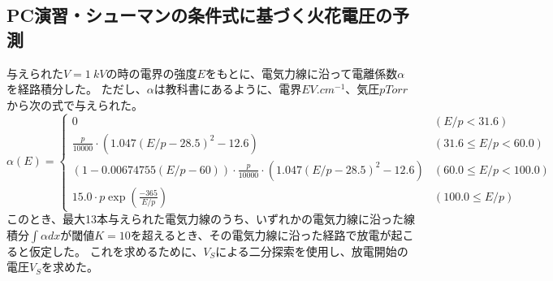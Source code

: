 \documentclass[a4paper]{ltjsarticle}
\begin{document}
\subsection{PC演習・シューマンの条件式に基づく火花電圧の予測}
与えられた$V=\SI{1}{kV}$の時の電界の強度$E$をもとに、電気力線に沿って電離係数$\alpha$を経路積分した。
ただし、$\alpha$は教科書にあるように、電界$E\si{V.cm^{-1}}$、気圧$p\si{Torr}$から次の式で与えられた。
\begin{equation}
    \alpha(E) = \begin{cases}
        0 & (E/p < 31.6) \\
        \frac{p}{10000}\cdot(1.047(E/p-28.5)^2 - 12.6) & (31.6 \leq E/p < 60.0) \\
        (1 - 0.00674755(E/p-60))\cdot\frac{p}{10000}\cdot(1.047(E/p-28.5)^2 - 12.6) & (60.0 \leq E/p < 100.0) \\
        15.0\cdot p\exp\left(\frac{-365}{E/p}\right) & (100.0 \leq E/p)
    \end{cases} \label{eq:alpha_sim}
\end{equation}
このとき、最大13本与えられた電気力線のうち、いずれかの電気力線に沿った線積分$\int\alpha dx$が閾値$K=10$を超えるとき、その電気力線に沿った経路で放電が起こると仮定した。
これを求めるために、$V_S$による二分探索を使用し、放電開始の電圧$V_S$を求めた。
\end{document}
